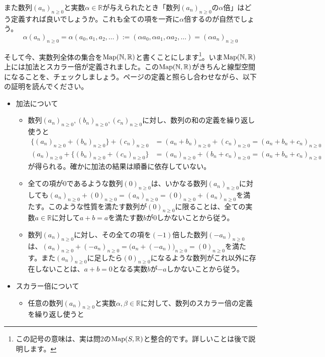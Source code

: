 また数列$(a_n)_{n \geq 0}$と実数$\alpha \in \mathbb{R}$が与えられたとき「数列$(a_n)_{n \geq 0}$の$\alpha$倍」はどう定義すれば良いでしょうか。これも全ての項を一斉に$\alpha$倍するのが自然でしょう。
\[
\alpha (a_n)_{n \geq 0} = \alpha (a_0, a_1, a_2, \ldots) := (\alpha a_0, \alpha a_1, \alpha a_2, \ldots) = (\alpha a_n)_{n \geq 0}
\]

そして今、実数列全体の集合を$\operatorname{Map}(\mathbb{N}, \mathbb{R})$と書くことにします\footnote{この記号の意味は、実は問$2$の$\operatorname{Map}(S,\mathbb{R})$と整合的です。詳しいことは後で説明します。}。いま$\operatorname{Map}(\mathbb{N}, \mathbb{R})$上には加法とスカラー倍が定義されました。この$\operatorname{Map}(\mathbb{N}, \mathbb{R})$がきちんと線型空間になることを、チェックしましょう。\pageref{def:vector_space}ページの定義と照らし合わせながら、以下の証明を読んでください。
\begin{itemize}
\item 加法について
\begin{itemize}
\item 数列$(a_n)_{n \geq 0}, (b_n)_{n \geq 0}, (c_n)_{n \geq 0}$に対し、数列の和の定義を繰り返し使うと
\begin{align*}
\bigl\{(a_n)_{n \geq 0} + (b_n)_{n \geq 0}\bigr\} + (c_n)_{n \geq 0}
&= (a_n + b_n)_{n \geq 0} + (c_n)_{n \geq 0} = (a_n + b_n + c_n)_{n \geq 0} \\
(a_n)_{n \geq 0} + \bigl\{(b_n)_{n \geq 0} + (c_n)_{n \geq 0}\}
&= (a_n)_{n \geq 0} + (b_n + c_n)_{n \geq 0} = (a_n + b_n + c_n)_{n \geq 0}
\end{align*}
が得られる。確かに加法の結果は順番に依存していない。
\item 全ての項が$0$であるような数列$(0)_{n \geq 0}$は、いかなる数列$(a_n)_{n \geq 0}$に対しても$(a_n)_{n \geq 0} + (0)_{n \geq 0} = (a_n)_{n \geq 0} = (0)_{n \geq 0} + (a_n)_{n \geq 0}$を満たす。このような性質を満たす数列が$(0)_{n \geq 0}$に限ることは、全ての実数$a\in\mathbb{R}$に対して$a + b = a$を満たす数$b$が$0$しかないことから従う。
\item 数列$(a_n)_{n \geq 0}$に対し、その全ての項を$(-1)$倍した数列$(-a_n)_{n \geq 0}$は、$(a_n)_{n \geq 0} + (-a_n)_{n \geq 0} = \bigl(a_n + (-a_n)\bigr)_{n \geq 0} = (0)_{n \geq 0}$を満たす。また$(a_n)_{n \geq 0}$に足したら$(0)_{n \geq 0}$になるような数列がこれ以外に存在しないことは、$a + b = 0$となる実数$b$が$-a$しかないことから従う。
\end{itemize}
\item スカラー倍について
\begin{itemize}
\item 任意の数列$(a_n)_{n \geq 0}$と実数$\alpha, \beta\in\mathbb{R}$に対して、数列のスカラー倍の定義を繰り返し使うと

\end{itemize}
\end{itemize}
